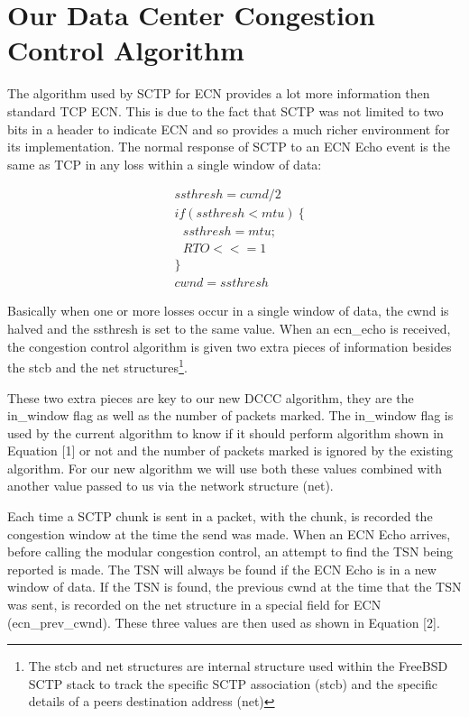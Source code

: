 \documentclass[12pt]{article}
\begin{document}
\section{Our Data Center Congestion Control Algorithm}
\label{algo}
The algorithm used by SCTP for ECN provides a lot more information then
standard TCP ECN. This is due to the fact that SCTP was not limited to two bits
in a header to indicate ECN and so provides a much richer environment for its
implementation. The normal response of SCTP to an ECN Echo event is the same
as TCP in any loss within a single window of data:

\begin{equation}
\begin{split}
&ssthresh = cwnd / 2\\
&if (ssthresh < mtu)~\{ \\
&~~~ssthresh = mtu; \\
&~~~RTO <<= 1\\
&\} \\
&cwnd = ssthresh
\end{split}
\label{algo1}
\end{equation}

Basically when one or more losses occur in a single window of data, the cwnd is halved and
the ssthresh is set to the same value. When an ecn\_echo is received, the congestion
control algorithm is given two extra pieces of information besides the stcb and the 
net structures\footnote{The stcb and net structures are internal structure used within the FreeBSD SCTP
stack to track the specific SCTP association (stcb) and the specific details of a peers destination
address (net)}.

These two extra pieces are key to our new DCCC algorithm, they are
the in\_window flag as well as the number of packets marked. The in\_window flag
is used by the current algorithm to know if it should perform algorithm shown in Equation [1] or not and
the number of packets marked is ignored by the existing algorithm. For
our new algorithm we will use both these values combined with another value passed
to us via the network structure (net).

Each time a SCTP chunk is sent in a packet, with the chunk, is recorded the congestion
window at the time the send was made. When an ECN Echo arrives, before calling
the modular congestion control, an attempt to find the TSN being reported is made. The TSN
will always be found if the ECN Echo is in a new window of data. If the TSN
is found, the previous cwnd at the time that the TSN was sent, is recorded on
the net structure in a special field for ECN (ecn\_prev\_cwnd).  These three values are then used as shown in Equation [2].
\end{document}
